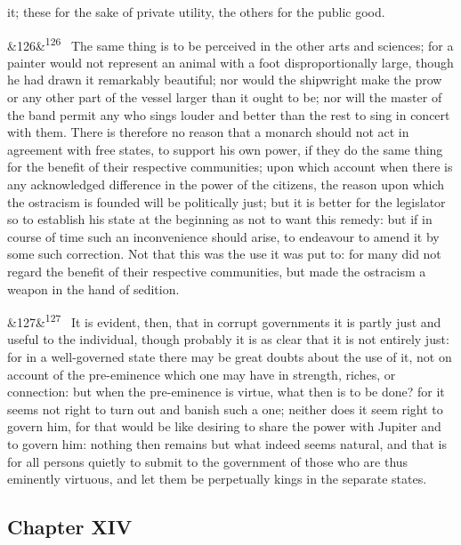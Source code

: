 \documentclass[12pt]{article}
\newcommand{\para}[1][]{\par\noindent\ifx&#1&\else\textsuperscript{\footnotesize #1}~\fi}
\begin{document}
it; these for the sake of private utility, the others for the public good.

\para[126] The same thing is to be perceived in the other arts and sciences; for a painter would not represent an animal with a foot disproportionally large, though he had drawn it remarkably beautiful; nor would the shipwright make the prow or any other part of the vessel larger than it ought to be; nor will the master of the band permit any who sings louder and better than the rest to sing in concert with them. There is therefore no reason that a monarch should not act in agreement with free states, to support his own power, if they do the same thing for the benefit of their respective communities; upon which account when there is any acknowledged difference in the power of the citizens, the reason upon which the ostracism is founded will be politically just; but it is better for the legislator so to establish his state at the beginning as not to want this remedy: but if in course of time such an inconvenience should arise, to endeavour to amend it by some such correction. Not that this was the use it was put to: for many did not regard the benefit of their respective communities, but made the ostracism a weapon in the hand of sedition.

\para[127] It is evident, then, that in corrupt governments it is partly just and useful to the individual, though probably it is as clear that it is not entirely just: for in a well-governed state there may be great doubts about the use of it, not on account of the pre-eminence which one may have in strength, riches, or connection: but when the pre-eminence is virtue, what then is to be done? for it seems not right to turn out and banish such a one; neither does it seem right to govern him, for that would be like desiring to share the power with Jupiter and to govern him: nothing then remains but what indeed seems natural, and that is for all persons quietly to submit to the government of those who are thus eminently virtuous, and let them be perpetually kings in the separate states.

\subsection*{Chapter XIV}
\end{document}
